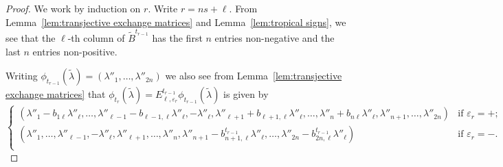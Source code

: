 \documentclass{amsart}
\numberwithin{theorem}{section}
\begin{document}
  \begin{proof}
    We work by induction on $r$.
    Write $r=ns+\ell$.
    From Lemma~\ref{lem:transjective exchange matrices} and Lemma~\ref{lem:tropical signs}, we see that the $\ell$-th column of $\tilde B^{t_{r-1}}$ has the first $n$ entries non-negative and the last $n$ entries non-positive.

    Writing $\phi_{t_{r-1}}(\tilde\lambda)=(\lambda''_1,\ldots,\lambda''_{2n})$ we also see from Lemma~\ref{lem:transjective exchange matrices} that $\phi_{t_r}(\tilde\lambda)=E^{t_{r-1}}_{\ell,\varepsilon_r}\phi_{t_{r-1}}(\tilde\lambda)$ is given by
    \[
      \begin{cases}
        (\lambda''_1-b_{1\ell}\lambda''_\ell,\ldots,\lambda''_{\ell-1}-b_{\ell-1,\ell}\lambda''_\ell,-\lambda''_\ell,\lambda''_{\ell+1}+b_{\ell+1,\ell}\lambda''_\ell,\ldots,\lambda''_n+b_{n\ell}\lambda''_\ell,\lambda''_{n+1},\ldots,\lambda''_{2n}) & \text{if $\varepsilon_r=+$;}\\
        (\lambda''_1,\ldots,\lambda''_{\ell-1},-\lambda''_\ell,\lambda''_{\ell+1},\ldots,\lambda''_n,\lambda''_{n+1}-b^{t_{r-1}}_{n+1,\ell}\lambda''_\ell,\ldots,\lambda''_{2n}-b^{t_{r-1}}_{2n,\ell}\lambda''_\ell) & \text{if $\varepsilon_r=-$.}\\
      \end{cases}
    \]
  \end{proof}


  
\end{document}
